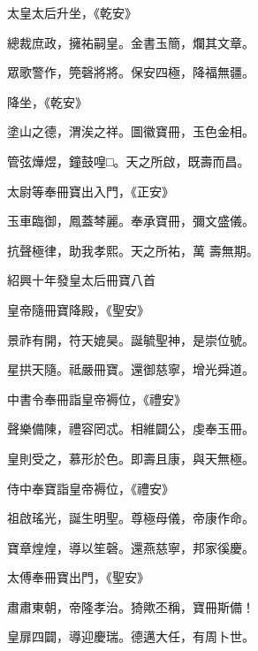 \begin{pinyinscope}
 太皇太后升坐，《乾安》



 總裁庶政，擁祐嗣皇。金書玉簡，爛其文章。



 眾歌警作，筦磬將將。保安四極，降福無疆。



 降坐，《乾安》



 塗山之德，渭涘之祥。圖徽寶冊，玉色金相。



 管弦燁煜，鐘鼓喤□。天之所啟，既壽而昌。



 太尉等奉冊寶出入門，《正安》



 玉車臨御，鳳蓋棽麗。奉承寶冊，彌文盛儀。



 抗聲極律，助我孝熙。天之所祐，萬
 壽無期。



 紹興十年發皇太后冊寶八首



 皇帝隨冊寶降殿，《聖安》



 景祚有開，符天媲昊。誕毓聖神，是崇位號。



 星拱天隨。祗嚴冊寶。還御慈寧，增光舜道。



 中書令奉冊詣皇帝褥位，《禮安》



 聲樂備陳，禮容罔忒。相維闢公，虔奉玉冊。



 皇則受之，慕形於色。即壽且康，與天無極。



 侍中奉寶詣皇帝褥位，《禮安》



 祖啟瑤光，誕生明聖。尊極母儀，帝康作命。



 寶章煌煌，導以笙磬。還燕慈寧，邦家徯慶。



 太傅奉冊寶出門，《聖安》



 肅肅東朝，帝隆孝治。猗歟丕稱，寶冊斯備！



 皇扉四闢，導迎慶瑞。德邁大任，有周卜世。




\end{pinyinscope}
